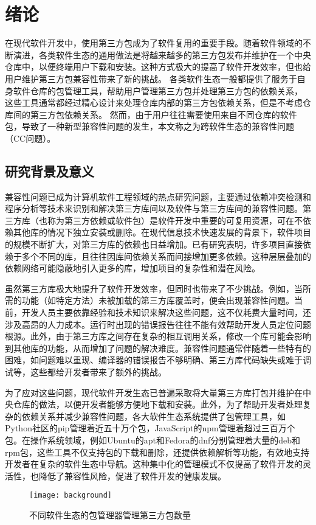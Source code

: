 \chapter{绪论}
在现代软件开发中，使用第三方包成为了软件复用的重要手段。随着软件领域的不断演进，各类软件生态的通用做法是将越来越多的第三方包发布并维护在一个中央仓库中，以便终端用户下载和安装。这种方式极大的提高了软件开发效率，但也给用户维护第三方包兼容性带来了新的挑战。
各类软件生态一般都提供了服务于自身软件仓库的包管理工具，帮助用户管理第三方包并处理第三方包的依赖关系，
这些工具通常都经过精心设计来处理仓库内部的第三方包依赖关系，但是不考虑仓库间的第三方包依赖关系。
然而，由于用户往往需要使用来自不同仓库的软件包，导致了一种新型兼容性问题的发生，本文称之为跨软件生态的兼容性问题（CC问题）。

\section{研究背景及意义}
兼容性问题已成为计算机软件工程领域的热点研究问题，主要通过依赖冲突检测和程序分析等技术来识别和解决第三方库间以及软件与第三方库间的兼容性问题。第三方库（也称为第三方依赖或软件包）是软件开发中重要的可复用资源，可在不依赖其他库的情况下独立安装或删除。在现代信息技术快速发展的背景下，软件项目的规模不断扩大，对第三方库的依赖也日益增加。已有研究表明，许多项目直接依赖于多个不同的库，且往往因库间依赖关系而间接增加更多依赖。这种层层叠加的依赖网络可能隐蔽地引入更多的库，增加项目的复杂性和潜在风险。

虽然第三方库极大地提升了软件开发效率，但同时也带来了不少挑战。例如，当所需的功能（如特定方法）未被加载的第三方库覆盖时，便会出现兼容性问题。当前，开发人员主要依靠经验和技术知识来解决这些问题，这不仅耗费大量时间，还涉及高昂的人力成本。运行时出现的错误报告往往不能有效帮助开发人员定位问题根源。此外，由于第三方库之间存在复杂的相互调用关系，修改一个库可能会影响到其他库的功能，从而增加了问题的解决难度。兼容性问题通常伴随着一些特有的困难，如问题难以重现、编译器的错误报告不够明确、第三方库代码缺失或难于调试等，这些都给开发者带来了额外的挑战。

为了应对这些问题，现代软件开发生态已普遍采取将大量第三方库打包并维护在中央仓库的做法，以便开发者能够方便地下载和安装。此外，为了帮助开发者处理复杂的依赖关系并减少兼容性问题，各大软件生态系统提供了包管理工具，如Python社区的pip管理着近五十万个包，JavaScript的npm管理着超过三百万个包。在操作系统领域，例如Ubuntu的apt和Fedora的dnf分别管理着大量的deb和rpm包，这些工具不仅支持包的下载和删除，还提供依赖解析等功能，有效地支持开发者在复杂的软件生态中导航。这种集中化的管理模式不仅提高了软件开发的灵活性，也降低了兼容性风险，促进了软件开发的健康发展。
\begin{figure}[htbp]
	\centering
	\texttt{[image: background]}
	\caption{不同软件生态的包管理器管理第三方包数量}
	\label{fig:bac}
\end{figure}

